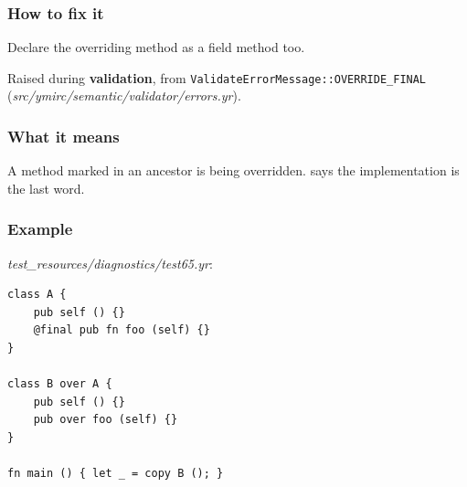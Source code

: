 \subsubsection*{How to fix it}

Declare the overriding method as a field method too.

\label{sec:codes:e4183}

Raised during \textbf{validation}, from \texttt{ValidateErrorMessage::\allowbreak{}OVERRIDE\_\allowbreak{}FINAL} (\textit{src/\allowbreak{}ymirc/\allowbreak{}semantic/\allowbreak{}validator/\allowbreak{}errors.yr}).

\subsubsection*{What it means}

A method marked  in an ancestor is being overridden.  says the implementation is the last word.

\subsubsection*{Example}

\textit{test\_\allowbreak{}resources/\allowbreak{}diagnostics/\allowbreak{}test65.yr}:

\begin{lstlisting}[style=coloredverbatimError]
class A {
    pub self () {}
    @final pub fn foo (self) {}
}

class B over A {
    pub self () {}
    pub over foo (self) {}
}

fn main () { let _ = copy B (); }
\end{lstlisting}

